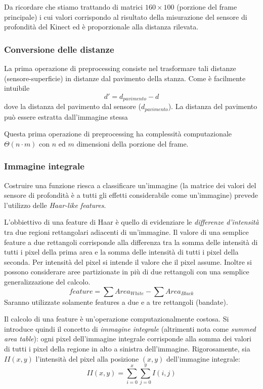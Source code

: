 Da ricordare che stiamo trattando di matrici $160 \times 100$ (porzione del frame principale) i cui valori corrispondo al risultato della misurazione del sensore di profondità del Kinect ed è proporzionale alla distanza rilevata.

\subsubsection{Conversione delle distanze} %
\label{ssub:conversione_delle_distanze}
La prima operazione di preprocessing consiste nel trasformare tali distanze (sensore-superficie) in distanze dal pavimento della stanza. Come è facilmente intuibile
$$ d' = d_{pavimento} - d $$
dove la distanza del pavimento dal sensore ($d_{pavimento}$). La distanza del pavimento può essere estratta dall'immagine stessa

Questa prima operazione di preprocessing ha complessità computazionale $\Theta(n \cdot m)$ con $n$ ed $m$ dimensioni della porzione del frame.

\subsubsection{Immagine integrale} %
\label{ssub:immagine_integrale}
Costruire una funzione riesca a classificare un'immagine (la matrice dei valori del sensore di profondità è a tutti gli effetti considerabile come un'immagine) prevede l'utilizzo delle \emph{Haar-like features}.

L'obbiettivo di una feature di Haar è quello di evidenziare le \emph{differenze d'intensità} tra due regioni rettangolari adiacenti di un'immagine. Il valore di una semplice feature a due rettangoli corrisponde alla differenza tra la somma delle intensità di tutti i pixel della prima area e la somma delle intensità di tutti i pixel della seconda. Per intensità del pixel si intende il valore che il pixel assume. Inoltre si possono considerare aree partizionate in più di due rettangoli con una semplice generalizzazione del calcolo.
$$feature = \sum Area_{White} - \sum Area_{Black}$$
Saranno utilizzate solamente features a due e a tre rettangoli (bandate).

Il calcolo di una feature è un'operazione computazionalmente costosa. Si introduce quindi il concetto di \emph{immagine integrale} (altrimenti nota come \emph{summed area table}): ogni pixel dell'immagine integrale corrisponde alla somma dei valori di tutti i pixel della regione in alto a sinistra dell'immagine.
Rigorosamente, sia $II(x,y)$ l'intensità del pixel alla posizione $(x,y)$ dell'immagine integrale: $$ II(x, y) = \sum_{i = 0}^{x} \sum_{j = 0}^{y} I(i, j) $$

